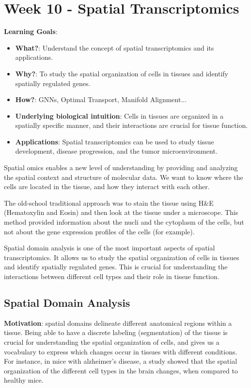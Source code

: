 \documentclass[a4paper]{article}
\begin{document}
\newpage  

\section*{Week 10 - Spatial Transcriptomics}

\textbf{Learning Goals}:

\begin{itemize}
  \item \textbf{What?}: Understand the concept of spatial transcriptomics and its applications.
  \item \textbf{Why?}: To study the spatial organization of cells in tissues and identify spatially regulated genes.
  \item \textbf{How?}: GNNs, Optimal Transport, Manifold Alignment...
  \item \textbf{Underlying biological intuition}: Cells in tissues are organized in a spatially specific manner, and their interactions are crucial for tissue function.
  \item \textbf{Applications}: Spatial transcriptomics can be used to study tissue development, disease progression, and the tumor microenvironment.
\end{itemize}

Spatial omics enables a new level of understanding by providing and analyzing
the spatial context and structure of molecular data. We want to know where
the cells are located in the tissue, and how they interact with each other. 

The old-school traditional approach was to stain the tissue using 
H\&E (Hematoxylin and Eosin) and then look at the tissue under a microscope. This
method provided information about the nucli and the cytoplasm of the cells, but
not about the gene expression profiles of the cells (for example).

Spatial domain analysis is one of the most important aspects of spatial
transcriptomics. It allows us to study the spatial organization of cells
in tissues and identify spatially regulated genes. This is crucial for
understanding the interactions between different cell types and their
role in tissue function.

\subsection*{Spatial Domain Analysis}

\textbf{Motivation}: spatial domains delineate different anatomical regions
within a tissue. Being able to have a discrete labeling (segmentation) of
the tissue is crucial for understanding the spatial organization of cells,
and gives us a vocabulary to express which changes occur in tissues with
different conditions. For instance, in mice with alzheimer's disease, a
study showed that the spatial organization of the different cell types
in the brain changes, when compared to healthy mice.
\end{document}
